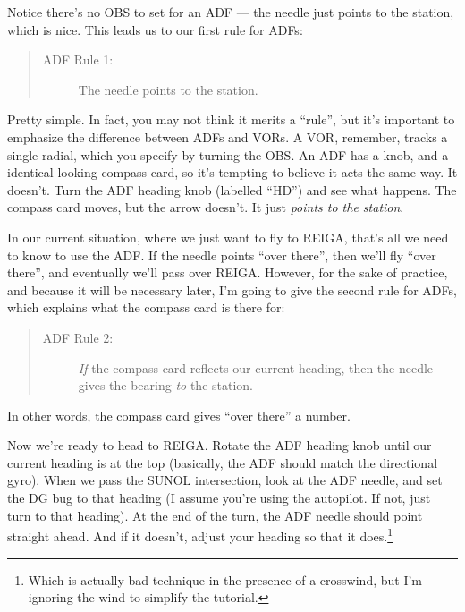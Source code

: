 Notice there's no OBS to set for an ADF --- the needle just points to
the station, which is nice.  This leads us to our first rule for ADFs:

\begin{quote}
  \begin{description}
  \item[ADF Rule 1:] The needle points to the station.
  \end{description}
\end{quote}

Pretty simple.  In fact, you may not think it merits a ``rule'', but
it's important to emphasize the difference between ADFs and VORs.  A
VOR, remember, tracks a single radial, which you specify by turning
the OBS.  An ADF has a knob, and a identical-looking compass card, so
it's tempting to believe it acts the same way.  It doesn't.  Turn the
ADF heading knob (labelled ``HD'') and see what happens.  The compass
card moves, but the arrow doesn't.  It just \emph{points to the
  station}.

In our current situation, where we just want to fly to REIGA, that's
all we need to know to use the ADF.  If the needle points ``over
there'', then we'll fly ``over there'', and eventually we'll pass over
REIGA.  However, for the sake of practice, and because it will be
necessary later, I'm going to give the second rule for ADFs, which
explains what the compass card is there for:

\begin{quote}
  \begin{description}
  \item[ADF Rule 2:] \emph{If} the compass card reflects our current
    heading, then the needle gives the bearing \emph{to} the station.
  \end{description}
\end{quote}

In other words, the compass card gives ``over there'' a number.


Now we're ready to head to REIGA.  Rotate the ADF heading knob until
our current heading is at the top (basically, the ADF should match the
directional gyro).  When we pass the SUNOL intersection, look at the
ADF needle, and set the DG bug to that heading (I assume you're using
the autopilot.  If not, just turn to that heading).  At the end of the
turn, the ADF needle should point straight
ahead. And if it
doesn't, adjust your heading so that it does.\footnote{Which is
  actually bad technique in the presence of a crosswind, but I'm
  ignoring the wind to simplify the tutorial.}

